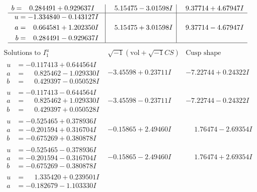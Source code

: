 \documentclass[1p]{elsarticle_modified}
\theoremstyle{definition}
\newcommand{\I}{\sqrt{-1}}
\begin{document}
$$\begin{array}{c|c|c}
\begin{aligned}
b &= \phantom{-}0.284491 + 0.929637 I\end{aligned}
 & \phantom{-}5.15475 - 3.01598 I & \phantom{-}9.37714 + 4.67947 I \\ \hline\begin{aligned}
u &= -1.334840 - 0.143127 I \\
a &= \phantom{-}0.664581 + 1.202350 I \\
b &= \phantom{-}0.284491 - 0.929637 I\end{aligned}
 & \phantom{-}5.15475 + 3.01598 I & \phantom{-}9.37714 - 4.67947 I\\
 \hline 
 \end{array}$$\newpage$$\begin{array}{c|c|c}  
\text{Solutions to }I^u_{1}& \I (\text{vol} + \sqrt{-1}CS) & \text{Cusp shape}\\
 \hline 
\begin{aligned}
u &= -0.117413 + 0.644564 I \\
a &= \phantom{-}0.825462 - 1.029330 I \\
b &= \phantom{-}0.429397 - 0.050528 I\end{aligned}
 & -3.45598 + 0.23711 I & -7.22744 + 0.24322 I \\ \hline\begin{aligned}
u &= -0.117413 - 0.644564 I \\
a &= \phantom{-}0.825462 + 1.029330 I \\
b &= \phantom{-}0.429397 + 0.050528 I\end{aligned}
 & -3.45598 - 0.23711 I & -7.22744 - 0.24322 I \\ \hline\begin{aligned}
u &= -0.525465 + 0.378936 I \\
a &= -0.201594 + 0.316704 I \\
b &= -0.675269 + 0.380878 I\end{aligned}
 & -0.15865 + 2.49460 I & \phantom{-}1.76474 - 2.69354 I \\ \hline\begin{aligned}
u &= -0.525465 - 0.378936 I \\
a &= -0.201594 - 0.316704 I \\
b &= -0.675269 - 0.380878 I\end{aligned}
 & -0.15865 - 2.49460 I & \phantom{-}1.76474 + 2.69354 I \\ \hline\begin{aligned}
u &= \phantom{-}1.335420 + 0.239501 I \\
a &= -0.182679 - 1.103330 I \\

\end{aligned}
\end{array}$$
\end{document}
